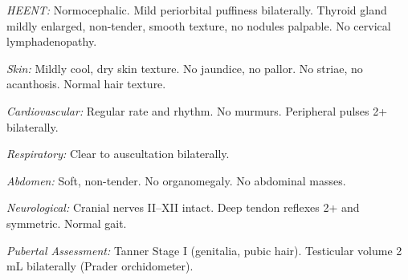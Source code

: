 \documentclass[11pt,a4paper]{article}
\begin{document}
\begin{tcolorbox}[pedgold, title={\faHeartbeat\enspace Physical Examination}]
\begin{minipage}[t]{0.46\linewidth}
{  \textit{HEENT:} Normocephalic. Mild periorbital puffiness bilaterally.
  Thyroid gland mildly enlarged, non-tender, smooth texture, no nodules palpable.
  No cervical lymphadenopathy.\medskip

  \textit{Skin:} Mildly cool, dry skin texture. No jaundice, no pallor.
  No striae, no acanthosis. Normal hair texture.\medskip

  \textit{Cardiovascular:} Regular rate and rhythm. No murmurs.
  Peripheral pulses 2+ bilaterally.\medskip

  \textit{Respiratory:} Clear to auscultation bilaterally.\medskip

  \textit{Abdomen:} Soft, non-tender. No organomegaly.
  No abdominal masses.\medskip

  \textit{Neurological:} Cranial nerves II--XII intact.
  Deep tendon reflexes 2+ and symmetric. Normal gait.\medskip

  \textit{Pubertal Assessment:} Tanner Stage I (genitalia, pubic hair).
  Testicular volume 2 mL bilaterally (Prader orchidometer).
  }
\end{minipage}

\end{tcolorbox}

\vspace{4mm}
\end{document}
